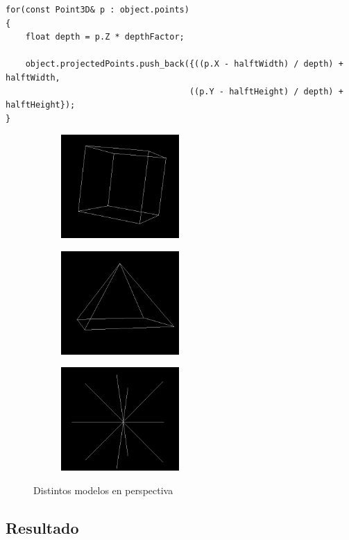 \begin{lstlisting}[style=C-color, caption={Cálculo de la perspectiva cónica}, label=cod:conicalperspective]
for(const Point3D& p : object.points)
{
    float depth = p.Z * depthFactor;
    
    object.projectedPoints.push_back({((p.X - halftWidth) / depth) + halftWidth,
                                     ((p.Y - halftHeight) / depth) + halftHeight});
}
\end{lstlisting}

\begin{figure}[h]
	\centering
	\begin{subfigure}[b]{0.3\textwidth}
		\centering
		\includegraphics[width=4.5cm]{archivos/cube}
	\end{subfigure}
	\begin{subfigure}[b]{0.3\textwidth}
		\centering
		\includegraphics[width=4.5cm]{archivos/pyramid}
	\end{subfigure}
	\begin{subfigure}[b]{0.3\textwidth}
		\centering
		\includegraphics[width=4.5cm]{archivos/star}
	\end{subfigure}
	\caption{Distintos modelos en perspectiva}
	\label{fig:models}
\end{figure}

\subsection{Resultado}

